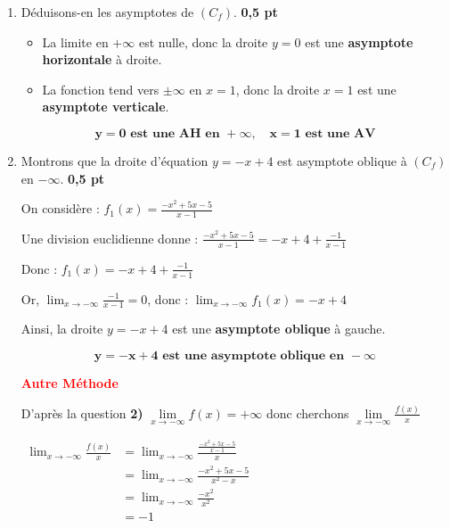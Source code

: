 \documentclass[12pt,a4paper]{article}
\begin{document}
\begin{enumerate}
    \item Déduisons-en les asymptotes de \( (C_f) \). \hfill \textbf{0{,}5 pt}
    
    \begin{itemize}
    \item La limite en \( +\infty \) est nulle, donc la droite \( y = 0 \) est une \textbf{asymptote horizontale} à droite.
    \item La fonction tend vers \( \pm\infty \) en \( x = 1 \), donc la droite \( x = 1 \) est une \textbf{asymptote verticale}.
		\end{itemize}
		 \begin{resultbox}
    	\[
    	\mathbf{y = 0 \text{ est une AH en } +\infty, \quad x = 1 \text{ est une AV}}
    	\]
		\end{resultbox} 
    
    \item Montrons que la droite d’équation \( y = -x + 4 \) est asymptote oblique à \( (C_f) \) en \( -\infty \). \hfill \textbf{0{,}5 pt}
    
    On considère : \( f_1(x) = \frac{-x^2 + 5x - 5}{x - 1} \)

		Une division euclidienne donne : \( \frac{-x^2 + 5x - 5}{x - 1} = -x + 4 + \frac{-1}{x - 1} \)

		Donc : \( f_1(x) = -x + 4 + \frac{-1}{x - 1} \)


Or, \(\lim_{x \to -\infty} \frac{-1}{x - 1} = 0\), donc : \( \lim_{x \to -\infty} f_1(x) = -x + 4 \)

Ainsi, la droite \( y = -x + 4 \) est une \textbf{asymptote oblique} à gauche.

		 \begin{resultbox}
    	\[
    	\mathbf{y = -x + 4 \text{ est une asymptote oblique en } -\infty}
    	\]
		\end{resultbox} 

\textcolor{red}{ \textbf{Autre Méthode} }

D'après la question \textbf{2)} \( \lim\limits_{x\to -\infty} f(x) = +\infty \) donc cherchons \( \lim\limits_{x\to -\infty} \frac{f(x)}{x} \)

\(
\begin{aligned}
	\lim_{x \to -\infty} \frac{f(x)}{x} &= \lim_{x \to -\infty} \frac{\frac{-x^2 + 5x - 5}{x - 1}}{x}\\
														&= \lim_{x \to -\infty} \frac{-x^2 + 5x - 5}{x^{2} - x}\\
														&= \lim_{x \to -\infty} \frac{-x^2}{x^{2}}\\
														&= -1\\
\end{aligned}
\)    


\end{enumerate}
\end{document}
